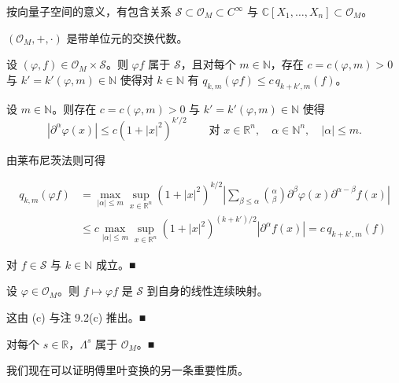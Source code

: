 \begin{remark}

\begin{items}
\item

按向量子空间的意义，有包含关系 $ \mathcal{S} \subset \mathcal{O}_M \subset C^\infty $ 与 $ \mathbb{C}[X_1,\ldots,X_n] \subset \mathcal{O}_M $。

\item

$ (\mathcal{O}_M,+,\cdot) $ 是带单位元的交换代数。

\item

设 $ (\varphi,f) \in \mathcal{O}_M \times \mathcal{S} $。则 $ \varphi f $ 属于 $ \mathcal{S} $，且对每个 $ m \in \mathbb{N} $，存在 $ c = c(\varphi,m) > 0 $ 与 $ k' = k'(\varphi,m) \in \mathbb{N} $ 使得对 $ k \in \mathbb{N} $ 有 $ q_{k,m}(\varphi f) \le c\, q_{k+k',m}(f) $。

\proofhead
设 $ m \in \mathbb{N} $。则存在 $ c = c(\varphi,m) > 0 $ 与 $ k' = k'(\varphi,m) \in \mathbb{N} $ 使得
\[
|\partial^\alpha\varphi(x)| \le c(1+|x|^2)^{k'/2} \qquad \text{对 } x \in \mathbb{R}^n, \quad \alpha \in \mathbb{N}^n, \quad |\alpha| \le m .
\]

由莱布尼茨法则可得

\begin{equation*}
\begin{aligned}
q_{k,m}(\varphi f) &= \max_{|\alpha|\le m}\sup_{x\in\mathbb{R}^n}(1+|x|^2)^{k/2}\left|\sum_{\beta\le\alpha}\binom{\alpha}{\beta}\partial^\beta\varphi(x)\partial^{\alpha-\beta}f(x)\right| \\ &\le c\max_{|\alpha|\le m}\sup_{x\in\mathbb{R}^n}(1+|x|^2)^{(k+k')/2}|\partial^\alpha f(x)| = c\, q_{k+k',m}(f)
\end{aligned}
\end{equation*}

对 $ f \in \mathcal{S} $ 与 $ k \in \mathbb{N} $ 成立。\nobreak\hspace{0.35em}■

\item

设 $ \varphi \in \mathcal{O}_M $。则 $ f \mapsto \varphi f $ 是 $ \mathcal{S} $ 到自身的线性连续映射。

\proofhead
这由 (c) 与注 9.2(c) 推出。\nobreak\hspace{0.35em}■
\item

对每个 $ s \in \mathbb{R} $，$ \Lambda^s $ 属于 $ \mathcal{O}_M $。\nobreak\hspace{0.35em}■

\end{items}

我们现在可以证明傅里叶变换的另一条重要性质。

\end{remark}

